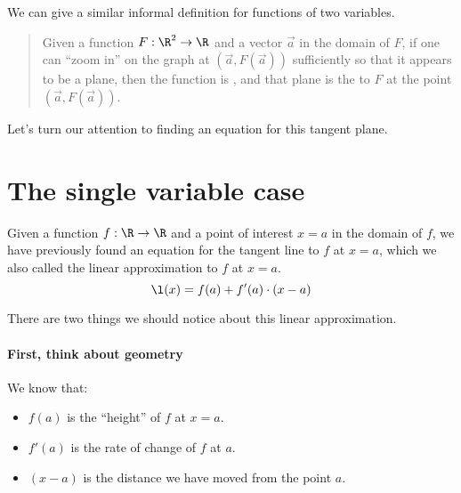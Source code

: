 \documentclass{ximera}
\begin{document}
We can give a similar informal definition for functions of two
variables.
\begin{quote}
  Given a function $F:\R^2\to\R$ and a vector $\vec{a}$ in the domain
  of $F$, if one can ``zoom in'' on the graph at $(\vec{a},
  F(\vec{a}))$ sufficiently so that it appears to be a plane, then the
  function is , and that plane is the  to $F$ at the point $(\vec{a},F(\vec{a}))$.
\end{quote}

Let's turn our attention to finding an equation for this tangent
plane.


\section{The single variable case}

Given a function $f : \R \to \R$ and a point of interest $x=a$ in the
domain of $f$, we have previously found an equation for the tangent
line to $f$ at $x=a$, which we also called the linear approximation to
$f$ at $x=a$.
\[
\l(x) = f(a) + f'(a) \cdot (x-a)
\]

There are two things we should notice about this linear approximation.

\paragraph{First, think about geometry}  We know that:
\begin{itemize}
\item $f(a)$ is the ``height'' of $f$ at $x=a$.
\item $f'(a)$ is the rate of change of $f$ at $a$.
\item $(x-a)$ is the distance we have moved from the point $a$.
\end{itemize}
\end{document}
